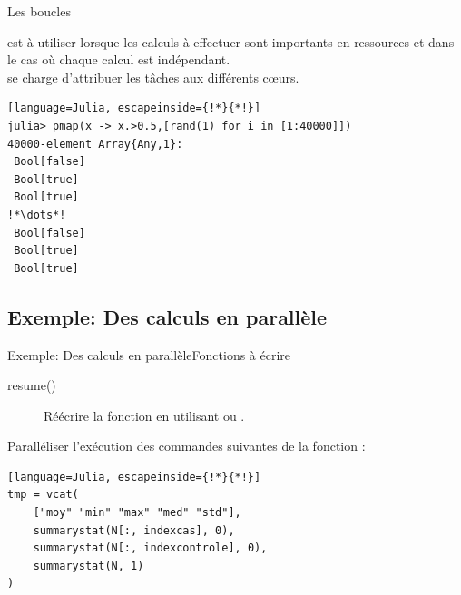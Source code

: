 \begin{frame}[containsverbatim]{Les boucles}
\par{ est à utiliser lorsque les calculs à effectuer sont importants en ressources et dans le cas où chaque calcul est indépendant.
\\\vspace{2ex} se charge d'attribuer les tâches aux différents c\oe{}urs.}
\begin{lstlisting}[language=Julia, escapeinside={!*}{*!}]
julia> pmap(x -> x.>0.5,[rand(1) for i in [1:40000]])
40000-element Array{Any,1}:
 Bool[false]
 Bool[true]
 Bool[true]
!*\dots*!
 Bool[false]
 Bool[true]
 Bool[true]
\end{lstlisting}
\end{frame}

\subsection{Exemple: Des calculs en parallèle}
\begin{frame}[containsverbatim]{\textcolor{goldenrod2}{Exemple:} Des calculs en parallèle}{Fonctions à écrire}
    \begin{description}
        \item[resume()] Réécrire la fonction  en utilisant  ou .
    \vspace{2ex}
    \end{description}
\par{Paralléliser l'exécution des commandes suivantes de la fonction :}
\begin{lstlisting}[language=Julia, escapeinside={!*}{*!}]
tmp = vcat(
    ["moy" "min" "max" "med" "std"],
    summarystat(N[:, indexcas], 0),
    summarystat(N[:, indexcontrole], 0),
    summarystat(N, 1)
)
\end{lstlisting}
\end{frame}


